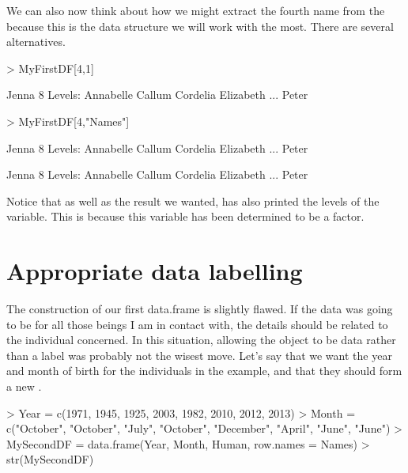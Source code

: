 We can also now think about how we might extract the fourth name from the  because this is the data structure we will work with the most. There are several alternatives. 
\begin{Schunk}
\begin{Sinput}
> MyFirstDF[4,1] 
\end{Sinput}
\begin{Soutput}
[1] Jenna
8 Levels: Annabelle Callum Cordelia Elizabeth ... Peter
\end{Soutput}
\begin{Sinput}
> MyFirstDF[4,"Names"] 
\end{Sinput}
\begin{Soutput}
[1] Jenna
8 Levels: Annabelle Callum Cordelia Elizabeth ... Peter
\end{Soutput}
\begin{Soutput}
[1] Jenna
8 Levels: Annabelle Callum Cordelia Elizabeth ... Peter
\end{Soutput}
\end{Schunk}
 
Notice that as well as the result we wanted, \R{} has also printed the levels of the  variable. This is because this variable has been determined to be a factor. 
 
 
 
\section{Appropriate data labelling} 
 
The construction of our first data.frame is slightly flawed. If the  data was going to be for all those beings I am in contact with, the details should be related to the individual concerned. In this situation, allowing the  object to be data rather than a label was probably not the wisest move. Let's say that we want the year and month of birth for the individuals in the example, and that they should form a new . 
\begin{Schunk}
\begin{Sinput}
> Year = c(1971, 1945, 1925, 2003, 1982, 2010, 2012, 2013) 
> Month = c("October", "October", "July", "October", "December", "April", "June", "June") 
> MySecondDF = data.frame(Year, Month, Human, row.names = Names) 
> str(MySecondDF) 
\end{Sinput}
\end{Schunk}
 
